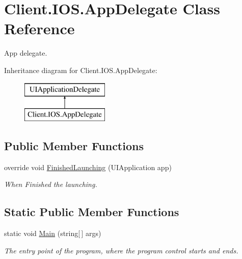 \hypertarget{classClient_1_1IOS_1_1AppDelegate}{}\section{Client.\+I\+O\+S.\+App\+Delegate Class Reference}
\label{classClient_1_1IOS_1_1AppDelegate}


App delegate.  


Inheritance diagram for Client.\+I\+O\+S.\+App\+Delegate\+:\begin{figure}[H]
\begin{center}
\leavevmode
\includegraphics[height=2.000000cm]{classClient_1_1IOS_1_1AppDelegate}
\end{center}
\end{figure}
\subsection*{Public Member Functions}
\begin{DoxyCompactItemize}
\item 
override void \hyperlink{classClient_1_1IOS_1_1AppDelegate_ab3aff8f50af1b2f6f31693fd9e7f14b0}{Finished\+Launching} (U\+I\+Application app)
\begin{DoxyCompactList}\small\item\em When Finished the launching. \end{DoxyCompactList}\end{DoxyCompactItemize}
\subsection*{Static Public Member Functions}
\begin{DoxyCompactItemize}
\item 
static void \hyperlink{classClient_1_1IOS_1_1AppDelegate_a7ded2aa81176d2fe25f81aa3055c332d}{Main} (string\mbox{[}$\,$\mbox{]} args)
\begin{DoxyCompactList}\small\item\em The entry point of the program, where the program control starts and ends. \end{DoxyCompactList}\end{DoxyCompactItemize}


